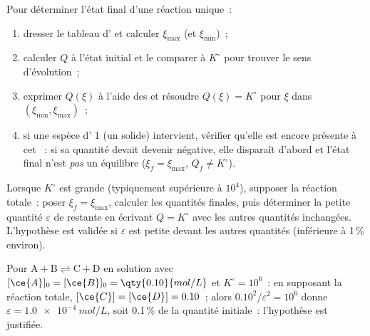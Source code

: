 \begin{method}\label{met:b1:extent-q-and-k:final-state}
Pour déterminer l'état final d'une réaction unique~:
\begin{enumerate}
  \item dresser le tableau d' et calculer $\xi_{\max}$ (et
        $\xi_{\min}$)~;
  \item calculer $Q$ à l'état initial et le comparer à $K^\circ$ pour
        trouver le sens d'évolution~;
  \item exprimer $Q(\xi)$ à l'aide des  et résoudre
        $Q(\xi) = K^\circ$ pour $\xi$ dans $(\xi_{\min}, \xi_{\max})$~;
  \item si une espèce d' 1 (un solide) intervient, vérifier
        qu'elle est encore présente à cet ~: si sa quantité
        devait devenir négative, elle disparaît d'abord et l'état final
        n'est \emph{pas} un équilibre ($\xi_f = \xi_{\max}$,
        $Q_f \ne K^\circ$).
\end{enumerate}
\end{method}

\begin{method}\label{met:b1:extent-q-and-k:quantitative}
Lorsque $K^\circ$ est grande (typiquement supérieure à $10^4$), supposer
la réaction totale~: poser $\xi_f = \xi_{\max}$, calculer les quantités
finales, puis déterminer la petite quantité $\varepsilon$ de  restante en écrivant $Q =
K^\circ$ avec les autres quantités inchangées. L'hypothèse est validée
si $\varepsilon$ est petite devant les autres quantités (inférieure à
1\,\% environ).
\end{method}

\begin{example}\label{ex:b1:extent-q-and-k:quant}
Pour $\mathrm{A + B \rightleftharpoons C + D}$ en solution avec
$[\ce{A}]_0 = [\ce{B}]_0 =
\qty{0.10}{mol/L}$ et $K^\circ = 10^6$~: en supposant la réaction
totale, $[\ce{C}]
= [\ce{D}] = 0.10$~; alors $0.10^2/\varepsilon^2 = 10^6$ donne $\varepsilon
= \qty{1.0e-4}{mol/L}$, soit 0.1\,\% de la quantité initiale~:
l'hypothèse est justifiée.
\end{example}

